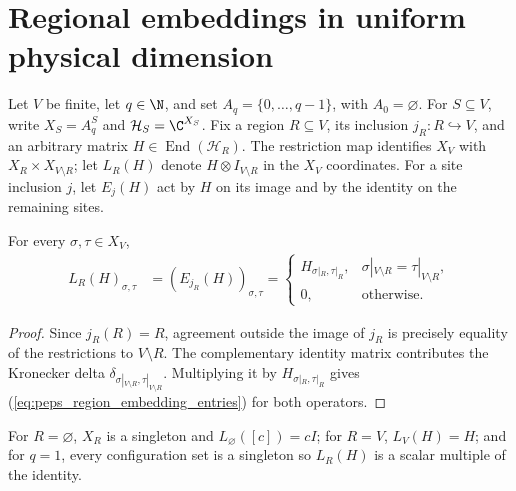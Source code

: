 \section{Regional embeddings in uniform physical dimension}
\label{sec:peps_region_operator_embedding}

Let $V$ be finite, let $q\in\N$, and set $A_q=\{0,\ldots,q-1\}$,
with $A_0=\varnothing$. For $S\subseteq V$, write $X_S=A_q^S$ and
$\mathcal H_S=\C^{X_S}$. Fix a region $R\subseteq V$, its inclusion
$j_R:R\hookrightarrow V$, and an arbitrary matrix
$H\in\operatorname{End}(\mathcal H_R)$.
The restriction map identifies $X_V$ with $X_R\times X_{V\setminus R}$;
let $L_R(H)$ denote $H\otimes I_{V\setminus R}$ in the $X_V$ coordinates.
For a site inclusion $j$, let $E_j(H)$ act by $H$ on its image and by the
identity on the remaining sites.

\begin{lemma}
    \label{thm:peps_region_site_embedding}
    \leanok
    For every $\sigma,\tau\in X_V$,
    \begin{align}
        L_R(H)_{\sigma,\tau}\label{eq:peps_region_embedding_entries}
         & =(E_{j_R}(H))_{\sigma,\tau}
        =\begin{cases}
             H_{\sigma|_R,\tau|_R},
                & \sigma|_{V\setminus R}=\tau|_{V\setminus R}, \\
             0, & \text{otherwise}.
         \end{cases}
    \end{align}
\end{lemma}
\begin{proof}
    \leanok
    Since $j_R(R)=R$, agreement outside the image of $j_R$ is precisely
    equality of the restrictions to $V\setminus R$.
    The complementary identity matrix contributes the Kronecker delta
    $\delta_{\sigma|_{V\setminus R},\tau|_{V\setminus R}}$.
    Multiplying it by $H_{\sigma|_R,\tau|_R}$ gives
    (\ref{eq:peps_region_embedding_entries}) for both operators.
\end{proof}

\begin{remark}
    For $R=\varnothing$, $X_R$ is a singleton and $L_\varnothing([c])=cI$;
    for $R=V$, $L_V(H)=H$; and for $q=1$, every configuration set is a
    singleton so $L_R(H)$ is a scalar multiple of the identity.
\end{remark}

